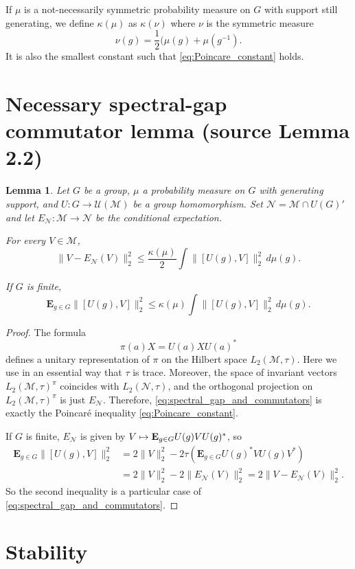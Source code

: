 \documentclass[10pt]{amsart}
\newcommand\mto{\mathchoice{\longmapsto}{\mapsto}{\mapsto}{\mapsto}}
\theoremstyle{plain}
\newtheorem{lemma}[theorem]{Lemma}
\theoremstyle{definition}
\newcommand{\cM}{\mathcal{M}}
\newcommand{\cN}{\mathcal{N}}
\newcommand{\E}{\mathbf{E}}
\newcommand{\cU}{\mathcal{U}}
\numberwithin{equation}{section}
\begin{document}
If $\mu$ is a not-necessarily symmetric probability measure on $G$ with support still generating, we define $\kappa(\mu)$ as $\kappa(\nu)$ where $\nu$ is the symmetric measure\vspace*{-3pt}
\[
\nu(g) = \frac{1}{2}(\mu(g)+\mu(g^{-1}).
\]
It is also the smallest constant such that \eqref{eq:Poincare_constant} holds.


\section*{Necessary spectral-gap commutator lemma (source Lemma 2.2)}
\setcounter{section}{2}\setcounter{theorem}{1}\setcounter{equation}{0}
\begin{lemma}\label{lemma:spectral_gap_commutator} Let $G$ be a group, $\mu$ a probability measure on $G$ with generating support, and $U\colon G\to \cU(\cM)$ be a group homomorphism. Set $\cN=\cM \cap U(G)'$ and let \hbox{$E_\cN:\cM\to\cN$} be the conditional expectation.

For every $V \in \cM$,
\begin{equation}\label{eq:spectral_gap_and_commutators} \| V - E_\cN(V)\|_2^2 \leq \frac{\kappa(\mu)}{2} \int \|[U(g),V]\|_2^2 \,d\mu(g).
\end{equation}

If $G$ is finite,
\[
\E_{g \in G} \|[U(g),V]\|_2^2 \leq \kappa(\mu) \int \|[U(g),V]\|_2^2 \,d\mu(g).
\]
\end{lemma}
\begin{proof} The formula
\[
\pi(a) X = U(a) X U(a)^*
\]
defines a unitary representation of $\pi$ on the Hilbert space $L_2(\cM,\tau)$. Here we use in an essential way that $\tau$ is trace. Moreover, the space of invariant vectors $L_2(\cM,\tau)^\pi$ coincides with $L_2(\cN,\tau)$, and the orthogonal projection on $L_2(\cM,\tau)^\pi$ is just $E_\cN$. Therefore, \eqref{eq:spectral_gap_and_commutators} is exactly the Poincaré inequality \eqref{eq:Poincare_constant}.

If $G$ is finite, $E_\cN$ is given by $V\mto \E_{g\in G} U(g) V U(g)^*$, so
\begin{align*} \E_{g \in G} \|[U(g),V]\|_2^2 &= 2\|V\|_2^2-2\tau(\E_{g \in G} U(g)^* V U(g)V^*)\\& = 2\|V\|_2^2-2\|E_\cN(V)\|_2^2 = 2\|V-E_\cN(V)\|_2^2.
\end{align*}
So the second inequality is a particular case of \eqref{eq:spectral_gap_and_commutators}.
\end{proof}
\setcounter{section}{3}
\section{Stability}\label{sec:stability}
\end{document}
